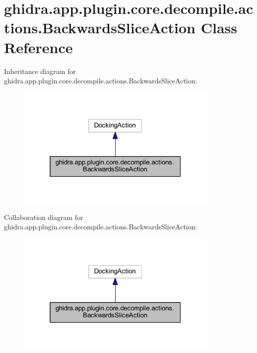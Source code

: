 \hypertarget{classghidra_1_1app_1_1plugin_1_1core_1_1decompile_1_1actions_1_1_backwards_slice_action}{}\section{ghidra.\+app.\+plugin.\+core.\+decompile.\+actions.\+Backwards\+Slice\+Action Class Reference}
\label{classghidra_1_1app_1_1plugin_1_1core_1_1decompile_1_1actions_1_1_backwards_slice_action}


Inheritance diagram for ghidra.\+app.\+plugin.\+core.\+decompile.\+actions.\+Backwards\+Slice\+Action\+:
\nopagebreak
\begin{figure}[H]
\begin{center}
\leavevmode
\includegraphics[width=277pt]{classghidra_1_1app_1_1plugin_1_1core_1_1decompile_1_1actions_1_1_backwards_slice_action__inherit__graph}
\end{center}
\end{figure}


Collaboration diagram for ghidra.\+app.\+plugin.\+core.\+decompile.\+actions.\+Backwards\+Slice\+Action\+:
\nopagebreak
\begin{figure}[H]
\begin{center}
\leavevmode
\includegraphics[width=277pt]{classghidra_1_1app_1_1plugin_1_1core_1_1decompile_1_1actions_1_1_backwards_slice_action__coll__graph}
\end{center}
\end{figure}
